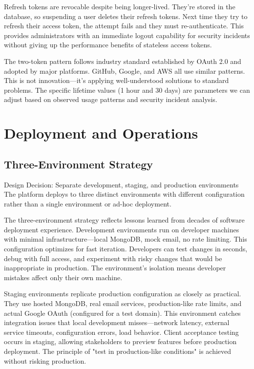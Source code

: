 \documentclass[12pt,a4paper]{article}
\begin{document}
Refresh tokens are revocable despite being longer-lived. They're stored in the database, so suspending a user deletes their refresh tokens. Next time they try to refresh their access token, the attempt fails and they must re-authenticate. This provides administrators with an immediate logout capability for security incidents without giving up the performance benefits of stateless access tokens.

The two-token pattern follows industry standard established by OAuth 2.0 and adopted by major platforms. GitHub, Google, and AWS all use similar patterns. This is not innovation—it's applying well-understood solutions to standard problems. The specific lifetime values (1 hour and 30 days) are parameters we can adjust based on observed usage patterns and security incident analysis.

\section{Deployment and Operations}

\subsection{Three-Environment Strategy}

\begin{rationale}{Design Decision: Separate development, staging, and production environments}
The platform deploys to three distinct environments with different configuration rather than a single environment or ad-hoc deployment.
\end{rationale}

The three-environment strategy reflects lessons learned from decades of software deployment experience. Development environments run on developer machines with minimal infrastructure—local MongoDB, mock email, no rate limiting. This configuration optimizes for fast iteration. Developers can test changes in seconds, debug with full access, and experiment with risky changes that would be inappropriate in production. The environment's isolation means developer mistakes affect only their own machine.

Staging environments replicate production configuration as closely as practical. They use hosted MongoDB, real email services, production-like rate limits, and actual Google OAuth (configured for a test domain). This environment catches integration issues that local development misses—network latency, external service timeouts, configuration errors, load behavior. Client acceptance testing occurs in staging, allowing stakeholders to preview features before production deployment. The principle of "test in production-like conditions" is achieved without risking production.
\end{document}
